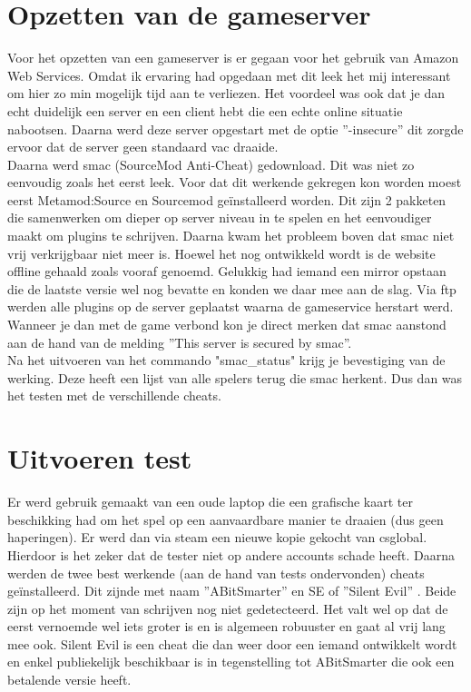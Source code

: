 \documentclass[pdftex,a4paper,12pt,twoside]{report}
\begin{document}
\section{Opzetten van de gameserver}
\label{sec:gameserver}
Voor het opzetten van een gameserver is er gegaan voor het gebruik van Amazon Web Services. Omdat ik ervaring had opgedaan met dit leek het mij interessant om hier zo min mogelijk tijd aan te verliezen. Het voordeel was ook dat je dan echt duidelijk een server en een client hebt die een echte online situatie nabootsen. Daarna werd deze server opgestart met de optie ''-insecure'' dit zorgde ervoor dat de server geen standaard \gls{vac} draaide.
\\

Daarna werd \gls{smac} (SourceMod Anti-Cheat) gedownload. Dit was niet zo eenvoudig zoals het eerst leek. Voor dat dit werkende gekregen kon worden moest eerst Metamod:Source en Sourcemod geïnstalleerd worden. Dit zijn 2 pakketen die samenwerken om dieper op server niveau in te spelen en het eenvoudiger maakt om plugins te schrijven.
Daarna kwam het probleem boven dat \gls{smac} niet vrij verkrijgbaar niet meer is. Hoewel het nog ontwikkeld wordt is de website offline gehaald zoals vooraf genoemd. Gelukkig had iemand een mirror opstaan die de laatste versie wel nog bevatte en konden we daar mee aan de slag. Via ftp werden alle plugins op de server geplaatst waarna de gameservice herstart werd. Wanneer je dan met de game verbond kon je direct merken dat \gls{smac} aanstond aan de hand van de melding ''This server is secured by \gls{smac}''. 
\\

Na het uitvoeren van het commando "smac\_status" krijg je bevestiging van de werking. Deze heeft een lijst van alle spelers terug die \gls{smac} herkent. Dus dan was het testen met de verschillende \gls{cheat}s.

\section{Uitvoeren test}
\label{sec:uitvoering}

Er werd gebruik gemaakt van een oude laptop die een grafische kaart ter beschikking had om het spel op een aanvaardbare manier te draaien (dus geen haperingen). Er werd dan via \gls{steam} een nieuwe kopie gekocht van \gls{csglobal}. Hierdoor is het zeker dat de tester niet op andere accounts schade heeft. Daarna werden de twee best werkende (aan de hand van tests ondervonden) \gls{cheat}s geïnstalleerd. Dit zijnde met naam ''ABitSmarter'' \citep{abitsmarter} en SE of ''Silent Evil'' \citep{silentevil}.
Beide zijn op het moment van schrijven nog niet gedetecteerd. Het valt wel op dat de eerst vernoemde wel iets groter is en is algemeen robuuster en gaat al vrij lang mee ook. Silent Evil is een \gls{cheat} die dan weer door een iemand ontwikkelt wordt en enkel publiekelijk beschikbaar is in tegenstelling tot ABitSmarter die ook een betalende versie heeft. 
\\
\end{document}
